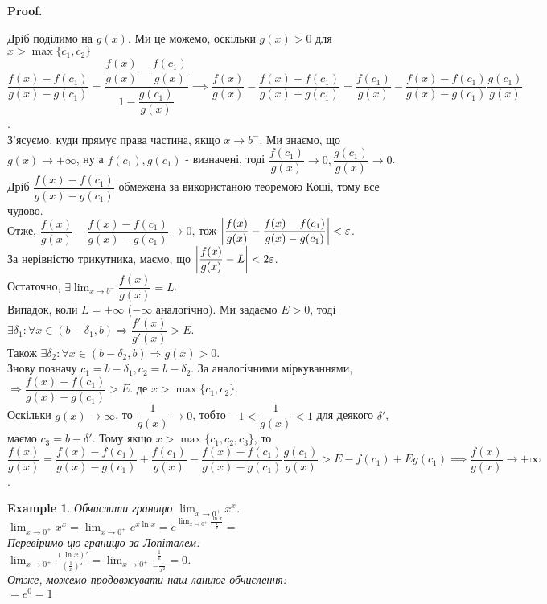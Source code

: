 \documentclass[a4paper, 14pt]{article}
\makeatletter
\def\qed{$\blacksquare$}
\theoremstyle{theoremdd}
\theoremstyle{theoremdd}
\theoremstyle{theoremdd}
\theoremstyle{theoremdd}
\newtheorem{example}[theorem]{Example}
\theoremstyle{theoremdd}
\theoremstyle{theoremdd}
\theoremstyle{theoremdd}
\theoremstyle{theoremdd}
\renewenvironment{proof}[1][Proof.\\]{\par
\pushQED{\hfill \qed}%
\normalfont \topsep6\p@\@plus6\p@\relax
\trivlist
\item\relax
{\bfseries
#1\@addpunct{.}}\hspace\labelsep\ignorespaces
}{%
\popQED\endtrivlist\@endpefalse
}
\makeatother
\begin{document}
\begin{proof}
Дріб поділимо на $g(x)$. Ми це можемо, оскільки $g(x) > 0$ для $x > \max \{c_1,c_2\}$\\
$\dfrac{f(x)-f(c_1)}{g(x)-g(c_1)} = \dfrac{\dfrac{f(x)}{g(x)} - \dfrac{f(c_1)}{g(x)}}{1 - \dfrac{g(c_1)}{g(x)}} \implies \dfrac{f(x)}{g(x)} - \dfrac{f(x)-f(c_1)}{g(x)-g(c_1)} = \dfrac{f(c_1)}{g(x)} - \dfrac{f(x)-f(c_1)}{g(x)-g(c_1)} \dfrac{g(c_1)}{g(x)}$.\\
З'ясуємо, куди прямує права частина, якщо $x \to b^-$. Ми знаємо, що $g(x) \to +\infty$, ну а $f(c_1),g(c_1)$ - визначені, тоді $\dfrac{f(c_1)}{g(x)} \to 0, \dfrac{g(c_1)}{g(x)} \to 0$. Дріб $\dfrac{f(x)-f(c_1)}{g(x)-g(c_1)}$ обмежена за використаною теоремою Коші, тому все чудово.\\
Отже, $\dfrac{f(x)}{g(x)} - \dfrac{f(x)-f(c_1)}{g(x)-g(c_1)} \to 0$, тож $\abs{\dfrac{f(x)}{g(x)} - \dfrac{f(x)-f(c_1)}{g(x)-g(c_1)}} < \varepsilon$.\\
За нерівністю трикутника, маємо, що $\abs{\dfrac{f(x)}{g(x)} - L} < 2\varepsilon$.\\
Остаточно, $\exists \displaystyle\lim_{x \to b^-} \dfrac{f(x)}{g(x)} = L$.
\bigskip \\
Випадок, коли $L = +\infty$ ($-\infty$ аналогічно). Ми задаємо $E > 0$, тоді $\exists \delta_1: \forall x \in (b-\delta_1,b) \Rightarrow \dfrac{f'(x)}{g'(x)} > E$.\\
Також $\exists \delta_2: \forall x \in (b-\delta_2, b) \Rightarrow g(x) > 0$.\\
Знову позначу $c_1 = b-\delta_1,c_2 = b-\delta_2$. За аналогічними міркуваннями, $\Rightarrow \dfrac{f(x)-f(c_1)}{g(x)-g(c_1)} > E$. де $x > \max \{c_1,c_2\}$.\\
Оскільки $g(x) \to \infty$, то $\dfrac{1}{g(x)} \to 0$, тобто $-1 < \dfrac{1}{g(x)} < 1$ для деякого $\delta'$, маємо $c_3 = b-\delta'$. Тому якщо $x > \max\{c_1,c_2,c_3\}$, то\\
$\dfrac{f(x)}{g(x)} = \dfrac{f(x)-f(c_1)}{g(x)-g(c_1)} + \dfrac{f(c_1)}{g(x)} - \dfrac{f(x)-f(c_1)}{g(x)-g(c_1)} \dfrac{g(c_1)}{g(x)} > E - f(c_1) + Eg(c_1) \implies \dfrac{f(x)}{g(x)} \to +\infty$.
\end{proof}

\begin{example}
Обчислити границю $\displaystyle \lim_{x \to 0^+} x^x$.\\
$\displaystyle \lim_{x \to 0^+} x^x = \lim_{x \to 0^+} e^{x \ln x} = e^{\displaystyle \lim_{x \to 0^+} \frac{\ln x}{\frac{1}{x}}} \boxed{=}$\\
Перевіримо цю границю за Лопіталем:\\
$\displaystyle \lim_{x \to 0^+} \frac{(\ln x)'}{\left(\frac{1}{x}\right)'} = \lim_{x \to 0^+} \frac{\frac{1}{x}}{-\frac{1}{x^2}} = 0$.\\
Отже, можемо продовжувати наш ланцюг обчислення:\\
$\boxed{=} e^0 = 1$
\end{example}
\end{document}
